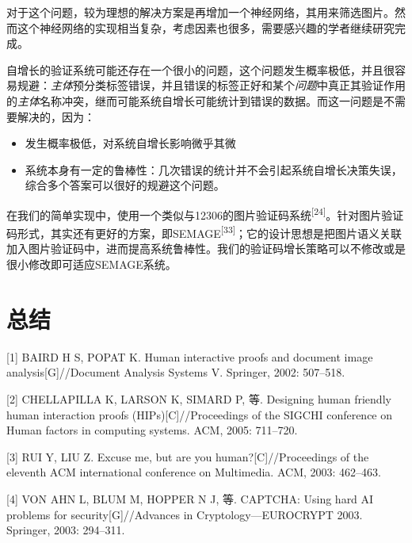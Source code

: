 \documentclass[bachelor,zhspacing]{cqu}  %
\def\tightlist{}
\begin{document}
对于这个问题，较为理想的解决方案是再增加一个神经网络，其用来筛选图片。然而这个神经网络的实现相当复杂，考虑因素也很多，需要感兴趣的学者继续研究完成。

自增长的验证系统可能还存在一个很小的问题，这个问题发生概率极低，并且很容易规避：\emph{主体}预分类标签错误，并且错误的标签正好和某个\emph{问题}中真正其验证作用的\emph{主体}名称冲突，继而可能系统自增长可能统计到错误的数据。而这一问题是不需要解决的，因为：

\begin{itemize}
\tightlist
\item
  发生概率极低，对系统自增长影响微乎其微
\item
  系统本身有一定的鲁棒性：几次错误的统计并不会引起系统自增长决策失误，综合多个答案可以很好的规避这个问题。
\end{itemize}

在我们的简单实现中，使用一个类似与12306的图片验证码系统\textsuperscript{{[}24{]}}。针对图片验证码形式，其实还有更好的方案，即SEMAGE\textsuperscript{{[}33{]}}；它的设计思想是把图片语义关联加入图片验证码中，进而提高系统鲁棒性。我们的验证码增长策略可以不修改或是很小修改即可适应SEMAGE系统。

\section{总结}\label{ux603bux7ed3}

\begin{thebibliography}{99}

\end{thebibliography}

\hypertarget{refs}{}
\hypertarget{ref-baird2002human}{}
{[}1{]} BAIRD H S, POPAT K. Human interactive proofs and document image
analysis{[}G{]}//Document Analysis Systems V. Springer, 2002: 507--518.

\hypertarget{ref-chellapilla2005designing}{}
{[}2{]} CHELLAPILLA K, LARSON K, SIMARD P, 等. Designing human friendly
human interaction proofs (HIPs){[}C{]}//Proceedings of the SIGCHI
conference on Human factors in computing systems. ACM, 2005: 711--720.

\hypertarget{ref-rui2003excuse}{}
{[}3{]} RUI Y, LIU Z. Excuse me, but are you human?{[}C{]}//Proceedings
of the eleventh ACM international conference on Multimedia. ACM, 2003:
462--463.

\hypertarget{ref-von2003captcha}{}
{[}4{]} VON AHN L, BLUM M, HOPPER N J, 等. CAPTCHA: Using hard AI
problems for security{[}G{]}//Advances in Cryptology---EUROCRYPT 2003.
Springer, 2003: 294--311.
\end{document}
